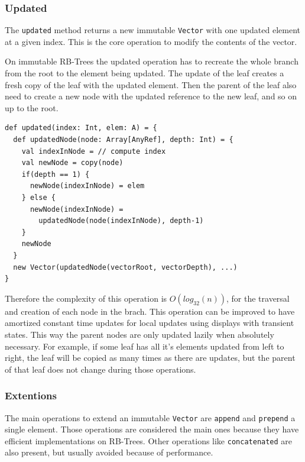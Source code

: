 
\subsubsection{Updated}
\label{sec:updated}
The \texttt{updated} method returns a new immutable \texttt{Vector} with one updated element at a given index. This is the core operation to modify the contents of the vector. 

On immutable RB-Trees the updated operation has to recreate the whole branch from the root to the element being updated. The update of the leaf creates a fresh copy of the leaf with the updated element. Then the parent of the leaf also need to create a new node with the updated reference to the new leaf, and so on up to the root. 

\begin{lstlisting}[frame=single]
def updated(index: Int, elem: A) = {
  def updatedNode(node: Array[AnyRef], depth: Int) = {
    val indexInNode = // compute index
    val newNode = copy(node)
    if(depth == 1) {
      newNode(indexInNode) = elem
    } else {
      newNode(indexInNode) = 
        updatedNode(node(indexInNode), depth-1)
    }
    newNode
  }
  new Vector(updatedNode(vectorRoot, vectorDepth), ...)
}
\end{lstlisting}

Therefore the complexity of this operation is $O(log_{32}(n))$, for the traversal and creation of each node in the brach. This operation can be improved to have amortized constant time updates for local updates using displays with transient states. This way the parent nodes are only updated lazily when absolutely necessary. For example, if some leaf has all it's elements updated from left to right, the leaf will be copied as many times as there are updates, but the parent of that leaf does not change during those operations.


\subsubsection{Extentions}
The main operations to extend an immutable \texttt{Vector} are \texttt{append} and \texttt{prepend} a single element. Those operations are considered the main ones because they have efficient implementations on RB-Trees. Other operations like \texttt{concatenated} are also present, but usually avoided because of performance.


